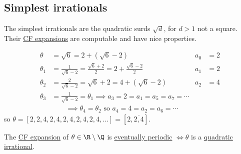 \documentclass{article}
\begin{document}
\subsection*{Simplest irrationals}
The simplest irrationals are the quadratic surds $\sqrt{d}$, for $d>1$ not a square.
Their \hyperlink{def:cfn}{CF expansions} are computable and have nice properties.
\begin{eg}
    \begin{align*}
        \theta &= \sqrt{6} = 2 + (\sqrt{6} - 2) & a_0&=2 \\
        \theta_1 &= \frac{1}{\sqrt{6}-2} = \frac{\sqrt{6} + 2}{2} = 2 + \frac{\sqrt{6}-2}{2} & a_1&=2\\
        \theta_2 &= \frac{2}{\sqrt{6}-2} = \sqrt{6}+2 = 4 + (\sqrt{6} - 2) & a_2&=4 \\
        \theta_3 &= \frac{1}{\sqrt{6}-2} = \theta_1 \implies a_3 = 2 = a_1 = a_5 = a_7 = \dotsb&& \\
                 & \qquad \implies \theta_4 = \theta_2 \text{ so } a_4 = 4 = a_2 = a_6 = \dotsb
    \end{align*}
    so $\theta = [2, 2, 4, 2, 4, 2, 4, 2, 4, 2, 4, \dotsc] = [2, \overline{2, 4}]$.
\end{eg}


\begin{nthm}[Lagrange]\label{thm:6.7}
    The \hyperlink{def:cfn}{CF expansion} of $\theta \in \R \setminus \Q$ is \hyperlink{def:period}{eventually periodic} $\iff \theta$ is a \hyperlink{def:qi}{quadratic irrational}.
\end{nthm}
\end{document}
